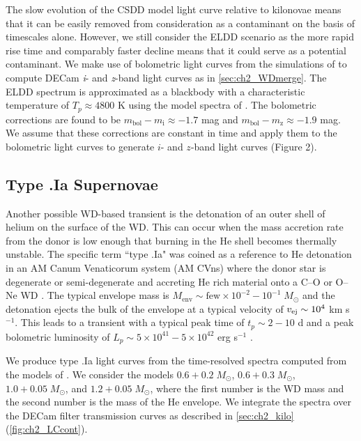 The slow evolution of the CSDD model light curve relative to kilonovae means that it can be easily removed from consideration as a contaminant on the basis of timescales alone. However, we still consider the ELDD scenario as the more rapid rise time and comparably faster decline means that it could serve as a potential contaminant. We make use of bolometric light curves from the simulations of \citet{Sim+12} to compute DECam {\em i}- and {\em z}-band light curves as in \autoref{sec:ch2_WDmerge}. The ELDD spectrum is approximated as a blackbody with a characteristic temperature of $T_p \approx 4800$ K using the model spectra of \citet[see their Figure 7]{Sim+12}. The bolometric corrections are found to be $m_{\text{bol}} - m_{\text{i}} \approx -1.7$  mag and $m_{\text{bol}} - m_{\text{z}} \approx -1.9$ mag. We assume that these corrections are constant in time and apply them to the bolometric light curves to generate $i$- and $z$-band light curves (Figure 2).

\subsection{Type .Ia Supernovae}
\label{sec:ch2_type.Ia}
Another possible WD-based transient is the detonation of an outer shell of helium on the surface of the WD. This can occur when the mass accretion rate from the donor is low enough that burning in the He shell becomes thermally unstable. The specific term ``type .Ia" was coined as a reference to He detonation in an AM Canum Venaticorum system (AM CVns) where the donor star is degenerate or semi-degenerate and accreting He rich material onto a C--O or O--Ne WD \citet{Bildsten+07,Shen+10}. The typical envelope mass is $M_{\text{env}} \sim \text{few}\times10^{-2}-10^{-1}\;M_{\odot}$ and the detonation ejects the bulk of the envelope at a typical velocity of $v_{\rm ej} \sim 10^4$ km s$^{-1}$. This leads to a transient with a typical peak time of $t_p \sim 2-10$ d and a peak bolometric luminosity of $L_p \sim 5\times10^{41} - 5\times 10^{42}$ erg s$^{-1}$ \citep{Shen+10}.

We produce type .Ia light curves from the time-resolved spectra computed from the models of \citet{Shen+10}. We consider the models $0.6+0.2\;M_{\odot}$, $0.6+0.3\;M_{\odot}$, $1.0+0.05\;M_{\odot}$, and $1.2+0.05\;M_{\odot}$, where the first number is the WD mass and the second number is the mass of the He envelope. We integrate the spectra over the DECam filter transmission curves as described in \autoref{sec:ch2_kilo} (\autoref{fig:ch2_LCcont}).

